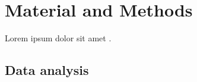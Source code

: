 \chapter{Material and Methods}

Lorem ipsum dolor sit amet \cite{paolo24satellite}.

\section{Data analysis}